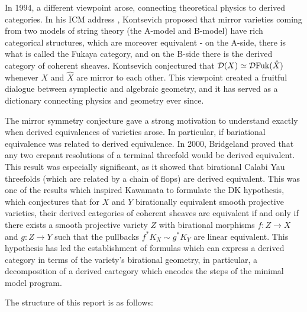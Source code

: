 In 1994, a different viewpoint arose, connecting theoretical physics to derived categories. In his ICM address \cite{kontsevich_homological_1994}, Kontsevich proposed that mirror varieties coming from two models of string theory (the A-model and B-model) have rich categorical structures, which are moreover equivalent - on the A-side, there is what is called the Fukaya category, and on the B-side there is the derived category of coherent sheaves. Kontsevich conjectured that $\mathcal{D}(X)\simeq \mathcal{D} \mathrm{Fuk}(\hat{X})$ whenever $X$ and $\hat{X}$ are mirror to each other. This viewpoint created a fruitful dialogue between symplectic and algebraic geometry, and it has served as a dictionary connecting physics and geometry ever since.

The mirror symmetry conjecture gave a strong motivation to understand exactly when derived equivalences of varieties arose. In particular, if bariational equivalence was related to derived equivalence. In 2000, Bridgeland proved that any two crepant resolutions of a terminal threefold would be derived equivalent. This result was especially significant, as it showed that birational Calabi Yau threefolds (which are related by a chain of flops) are derived equivalent. This was one of the results which inspired Kawamata to formulate the DK hypothesis, which conjectures that for $X$ and $Y$ birationally equivalent smooth projective varieties, their derived categories of coherent sheaves are equivalent if and only if there exists a smooth projective variety $Z$ with birational morphisms $f: Z \to X$ and $g: Z\to Y$ such that the pullbacks $f^{*}K_{X}\sim g^{*}K_{Y}$ are linear equivalent. This hypothesis has led the establishment of formulas which can express a derived category in terms of the variety's birational geometry, in particular, a decomposition of a derived cartegory which encodes the steps of the minimal model program.  

The structure of this report is as follows: 

